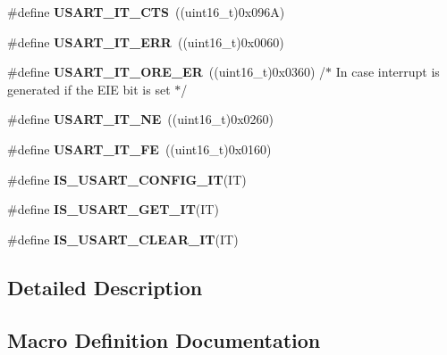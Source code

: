 \begin{DoxyCompactItemize}
\#define {\bfseries U\+S\+A\+R\+T\+\_\+\+I\+T\+\_\+\+C\+TS}~((uint16\+\_\+t)0x096\+A)
\item 
\mbox{\label{group___u_s_a_r_t___interrupt__definition_ga631e83efd4c4789128d80a9539faf78a}} 
\#define {\bfseries U\+S\+A\+R\+T\+\_\+\+I\+T\+\_\+\+E\+RR}~((uint16\+\_\+t)0x0060)
\item 
\mbox{\label{group___u_s_a_r_t___interrupt__definition_ga1faa2d618b7c1038f8cad50fec7d0ba4}} 
\#define {\bfseries U\+S\+A\+R\+T\+\_\+\+I\+T\+\_\+\+O\+R\+E\+\_\+\+ER}~((uint16\+\_\+t)0x0360) /$\ast$ In case interrupt is generated if the E\+I\+E bit is set $\ast$/
\item 
\mbox{\label{group___u_s_a_r_t___interrupt__definition_gad5de042f579b50f1e8643009176486b3}} 
\#define {\bfseries U\+S\+A\+R\+T\+\_\+\+I\+T\+\_\+\+NE}~((uint16\+\_\+t)0x0260)
\item 
\mbox{\label{group___u_s_a_r_t___interrupt__definition_ga9af8790f78f6cb1591506c57d0cc0fb3}} 
\#define {\bfseries U\+S\+A\+R\+T\+\_\+\+I\+T\+\_\+\+FE}~((uint16\+\_\+t)0x0160)
\item 
\#define {\bfseries I\+S\+\_\+\+U\+S\+A\+R\+T\+\_\+\+C\+O\+N\+F\+I\+G\+\_\+\+IT}(IT)
\item 
\#define {\bfseries I\+S\+\_\+\+U\+S\+A\+R\+T\+\_\+\+G\+E\+T\+\_\+\+IT}(IT)
\item 
\#define {\bfseries I\+S\+\_\+\+U\+S\+A\+R\+T\+\_\+\+C\+L\+E\+A\+R\+\_\+\+IT}(IT)
\end{DoxyCompactItemize}


\subsection{Detailed Description}


\subsection{Macro Definition Documentation}
\mbox{\label{group___u_s_a_r_t___interrupt__definition_ga3ceda175140b84eea02a2261ebda4efd}} 
